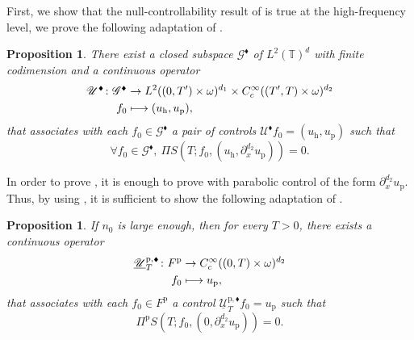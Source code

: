 \documentclass[JEP,XML,SOM,Unicode,NoEqCountersInSection]{cedram}
\let\mathcal\mathscr
\def\mto{\mathchoice{\longmapsto}{\mapsto}{\mapsto}{\mapsto}}
\newcommand{\sblacklozenge}{{\scriptscriptstyle \blacklozenge}}
\theoremstyle{plain}
\newtheorem{prop}[theorem]{Proposition}
\theoremstyle{definition}
\theoremstyle{remark}
\newcommand{\set}{\mathbb}
\newcommand{\T}{\set{T}}
\newcommand{\h}{{\mathrm h}}
\newcommand{\p}{{\mathrm p}}
\begin{document}
First, we show that the null-controllability result of  is true at the high-frequency level, \ie we prove the following adaptation of .
\begin{prop}
\label{PropControlHighFreqd_x}
There exist a closed subspace $\mathcal{G}^{\sblacklozenge}$ of $L^2(\T)^{d}$ with finite codimension and a continuous operator
\begin{align*}
\mathcal{U}^{\sblacklozenge} \colon
\mathcal{G}^{\sblacklozenge} &\to L^2((0,T')\times\omega)^{d_1} \times C^\infty_c((T',T)\times\omega)^{d_2}\\
f_0 &\mto (u_{\h},u_{\p}),
\end{align*}
that associates with each $f_0 \in \mathcal{G}^{\sblacklozenge} $ a pair of controls $\mathcal{U}^{\sblacklozenge} f_{0}=(u_{\h},u_{\p})$ such that
\begin{equation}
\label{PropKd_x}
\forall f_0 \in \mathcal{G}^{\sblacklozenge},\ \Pi S(T;f_0, (u_{\h},\partial_{x}^{d_2}u_{\p})) = 0.
\end{equation}
\end{prop}
In order to prove , it is enough to prove  with
parabolic control of the form $\partial_{x}^{d_2} u_{\p}$. Thus, by using
, it is sufficient to show the following adaptation of
.
\begin{prop}
\label{LemPar_Bisd_x}
If $n_0$ is large enough, then for every $T>0$, there exists a continuous operator
\begin{align*}
\underline{\mathcal{U}}_T^{\p,\sblacklozenge} \colon
F^\p & \to C^\infty_c((0,T)\times\omega)^{d_2} \\
f_0 &\mto u_{\p},
\end{align*}
that associates with each $f_0 \in F^{\p} $ a control $\underline{\mathcal{U}}_T^{\p,\sblacklozenge} f_{0}=u_{\p}$ such that
\begin{equation*}
\Pi^{\p} S(T; f_0, (0, \partial_{x}^{d_2}u_{\p})) = 0.
\end{equation*}
\end{prop}
\end{document}
